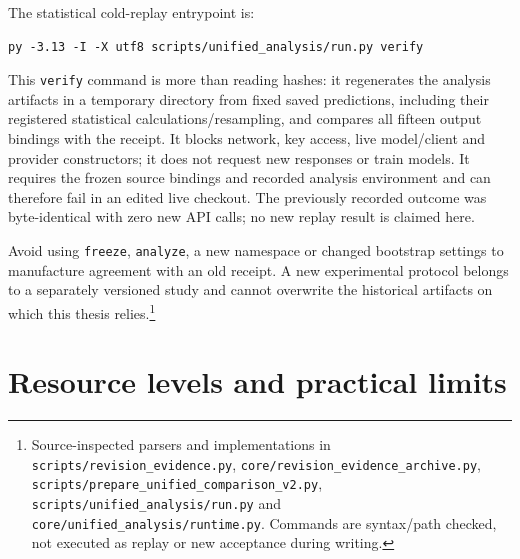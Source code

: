 The statistical cold-replay entrypoint is:

\begin{Verbatim}[fontsize=\small,breaklines=true,breakanywhere=true]
py -3.13 -I -X utf8 scripts/unified_analysis/run.py verify
\end{Verbatim}

This \texttt{verify} command is more than reading hashes: it regenerates the
analysis artifacts in a temporary directory from fixed saved predictions,
including their registered statistical calculations/resampling, and
compares all fifteen output bindings with the receipt. It blocks network,
key access, live model/client and provider constructors; it does not
request new responses or train models. It requires the frozen source
bindings and recorded analysis environment and can therefore fail in an
edited live checkout. The previously recorded outcome was byte-identical
with zero new API calls; no new replay result is claimed here.

Avoid using \texttt{freeze}, \texttt{analyze}, a new namespace or changed bootstrap
settings to manufacture agreement with an old receipt. A new experimental
protocol belongs to a separately versioned study and cannot overwrite the
historical artifacts on which this thesis relies.\footnote{Source-inspected parsers and implementations in \texttt{scripts/\allowbreak{}revision\_\allowbreak{}evidence.\allowbreak{}py}, \texttt{core/\allowbreak{}revision\_\allowbreak{}evidence\_\allowbreak{}archive.\allowbreak{}py}, \texttt{scripts/\allowbreak{}prepare\_\allowbreak{}unified\_\allowbreak{}comparison\_\allowbreak{}v2.\allowbreak{}py}, \texttt{scripts/\allowbreak{}unified\_\allowbreak{}analysis/\allowbreak{}run.\allowbreak{}py} and \texttt{core/\allowbreak{}unified\_\allowbreak{}analysis/\allowbreak{}runtime.\allowbreak{}py}. Commands are syntax/path checked, not executed as replay or new acceptance during writing.}

\section{Resource levels and practical limits}\label{s:64005ab00ff26299}

\begingroup
\small
{}
\setlength{\tabcolsep}{3pt}

